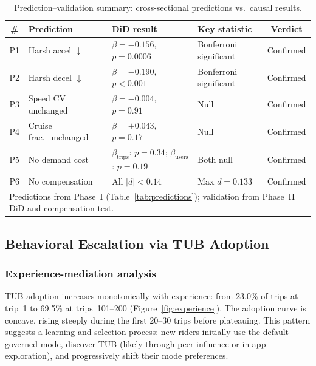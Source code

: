 \begin{table}[htbp]
\centering
\caption{Prediction--validation summary: cross-sectional predictions vs.\ causal results.}
\label{tab:validation}
\small
\begin{tabular}{clp{2.8cm}p{3.5cm}c}
\toprule
\textbf{\#} & \textbf{Prediction} & \textbf{DiD result} & \textbf{Key statistic} & \textbf{Verdict} \\
\midrule
P1 & Harsh accel $\downarrow$ & $\beta = -0.156$, $p = 0.0006$ & Bonferroni significant & Confirmed \\
P2 & Harsh decel $\downarrow$ & $\beta = -0.190$, $p < 0.001$ & Bonferroni significant & Confirmed \\
P3 & Speed CV unchanged & $\beta = -0.004$, $p = 0.91$ & Null & Confirmed \\
P4 & Cruise frac.\ unchanged & $\beta = +0.043$, $p = 0.17$ & Null & Confirmed \\
P5 & No demand cost & $\beta_{\text{trips}}$: $p = 0.34$; $\beta_{\text{users}}$: $p = 0.19$ & Both null & Confirmed \\
P6 & No compensation & All $|d| < 0.14$ & Max $d = 0.133$ & Confirmed \\
\bottomrule
\multicolumn{5}{l}{\footnotesize Predictions from Phase~I (Table~\ref{tab:predictions}); validation from Phase~II DiD and compensation test.} \\
\end{tabular}
\end{table}

\subsection{Behavioral Escalation via TUB Adoption}
\label{sec:res_escalation}

\subsubsection{Experience-mediation analysis}

TUB adoption increases monotonically with experience: from 23.0\% of trips at trip~1 to 69.5\% at trips~101--200 (Figure~\ref{fig:experience}). The adoption curve is concave, rising steeply during the first 20--30 trips before plateauing. This pattern suggests a learning-and-selection process: new riders initially use the default governed mode, discover TUB (likely through peer influence or in-app exploration), and progressively shift their mode preferences.

